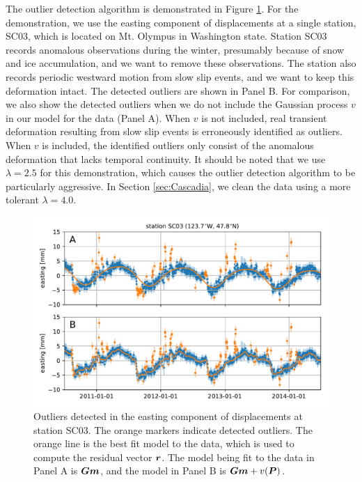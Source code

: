 \documentclass[extra,mreferee]{gji}
\begin{document}
The outlier detection algorithm is demonstrated in Figure \ref{fig:Outliers}. For the demonstration, we use the easting component of displacements at a single station, SC03, which is located on Mt. Olympus in Washington state. Station SC03 records anomalous observations during the winter, presumably because of snow and ice accumulation, and we want to remove these observations. The station also records periodic westward motion from slow slip events, and we want to keep this deformation intact. The detected outliers are shown in Panel B. For comparison, we also show the detected outliers when we do not include the Gaussian process $v$ in our model for the data (Panel A). When $v$ is not included, real transient deformation resulting from slow slip events is erroneously identified as outliers. When $v$ is included, the identified outliers only consist of the anomalous deformation that lacks temporal continuity.  It should be noted that we use $\lambda = 2.5$ for this demonstration, which causes the outlier detection algorithm to be particularly aggressive. In Section \ref{sec:Cascadia}, we clean the data using a more tolerant $\lambda = 4.0$.         

\begin{figure}
\includegraphics{figures/outliers_new/outliers.pdf}
\caption{Outliers detected in the easting component of displacements at station SC03. The orange markers indicate detected outliers. The orange line is the best fit model to the data, which is used to compute the residual vector $\mitbf{r}$. The model being fit to the data in Panel A is $\mitbf{G}\mitbf{m}$, and the model in Panel B is $\mitbf{G}\mitbf{m} + v(\mitbf{P})$.}
\label{fig:Outliers}
\end{figure}


  
\end{document}
